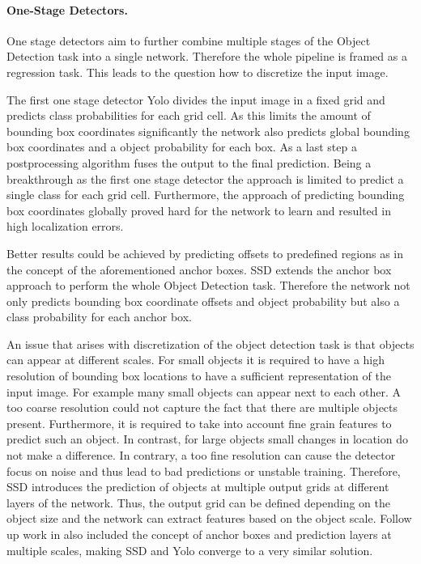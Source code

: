 \paragraph{One-Stage Detectors.}

One stage detectors aim to further combine multiple stages of the Object Detection task into a single network. Therefore the whole pipeline is framed as a regression task. This leads to the question how to discretize the input image. 

The first one stage detector \ac{Yolo}\cite{Redmon} divides the input image in a fixed grid and predicts class probabilities for each grid cell. As this limits the amount of bounding box coordinates significantly the network also predicts global bounding box coordinates and a object probability for each box. As a last step a postprocessing algorithm fuses the output to the final prediction. Being a breakthrough as the first one stage detector the approach is limited to predict a single class for each grid cell. Furthermore, the approach of predicting bounding box coordinates globally proved hard for the network to learn and resulted in high localization errors.

Better results could be achieved by predicting offsets to predefined regions as in the concept of the aforementioned anchor boxes. \ac{SSD} \cite{Liu} extends the anchor box approach to perform the whole Object Detection task. Therefore the network not only predicts bounding box coordinate offsets and object probability but also a class probability for each anchor box. 

An issue that arises with discretization of the object detection task is that objects can appear at different scales. For small objects it is required to have a high resolution of bounding box locations to have a sufficient representation of the input image. For example many small objects can appear next to each other. A too coarse resolution could not capture the fact that there are multiple objects present. Furthermore, it is required to take into account fine grain features to predict such an object. In contrast, for large objects small changes in location do not make a difference. In contrary, a too fine resolution can cause the detector focus on noise and thus lead to bad predictions or unstable training. Therefore, \ac{SSD} introduces the prediction of objects at multiple output grids at different layers of the network. Thus, the output grid can be defined depending on the object size and the network can extract features based on the object scale. Follow up work in \cite{Redmon, Redmona} also included the concept of anchor boxes and prediction layers at multiple scales, making \ac{SSD} and \ac{Yolo} converge to a very similar solution.

